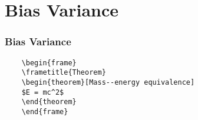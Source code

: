 \section{Bias Variance}

\begin{frame}[fragile] %
    \frametitle{Bias Variance}
    \begin{example}
    \begin{verbatim}
    \begin{frame}
    \frametitle{Theorem}
    \begin{theorem}[Mass--energy equivalence]
    $E = mc^2$
    \end{theorem}
    \end{frame}\end{verbatim}
    \end{example}
\end{frame}